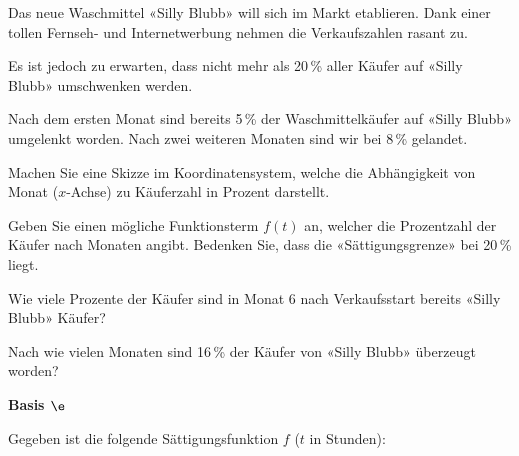 Das neue Waschmittel «Silly Blubb» will sich im Markt etablieren.
Dank einer tollen Fernseh- und Internetwerbung nehmen die
Verkaufszahlen rasant zu.

Es ist jedoch zu erwarten, dass nicht mehr als 20\,\% aller Käufer auf
«Silly Blubb» umschwenken werden.

Nach dem ersten Monat sind bereits 5\,\% der Waschmittelkäufer auf
«Silly Blubb» umgelenkt worden. Nach zwei weiteren Monaten sind wir
bei 8\,\% gelandet.


\begin{bbwAufgabenBlock}
\item Machen Sie eine Skizze im Koordinatensystem, welche die
Abhängigkeit von Monat ($x$-Achse) zu Käuferzahl in Prozent darstellt.


\item Geben Sie einen mögliche Funktionsterm $f(t)$ an, welcher die
Prozentzahl der Käufer nach Monaten angibt. Bedenken Sie, dass die
«Sättigungsgrenze» bei 20\,\% liegt.


\item Wie viele Prozente der Käufer sind in Monat 6 nach Verkaufsstart
  bereits «Silly Blubb» Käufer?
  

\item Nach wie vielen Monaten sind 16\,\% der Käufer von «Silly Blubb»
  überzeugt worden?


\end{bbwAufgabenBlock}


\platzFuerBerechnungenBisEndeSeite{}


\bbwActAufgabenNr{} \textbf{Basis $\e$}

Gegeben ist die folgende Sättigungsfunktion $f$ ($t$ in Stunden):

